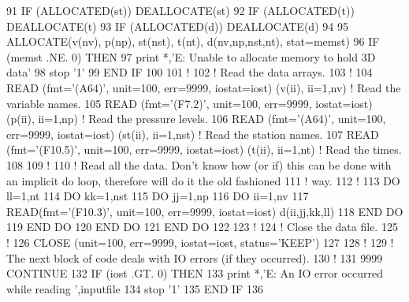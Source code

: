 \begin{DoxyCode}
91     \textcolor{keywordflow}{IF} (\textcolor{keyword}{ALLOCATED}(st))  \textcolor{keyword}{DEALLOCATE}(st)
92     \textcolor{keywordflow}{IF} (\textcolor{keyword}{ALLOCATED}(t))   \textcolor{keyword}{DEALLOCATE}(t)
93     \textcolor{keywordflow}{IF} (\textcolor{keyword}{ALLOCATED}(d))   \textcolor{keyword}{DEALLOCATE}(d)
94 
95     \textcolor{keyword}{ALLOCATE}(v(nv), p(np), st(nst), t(nt), d(nv,np,nst,nt), stat=memst)
96     \textcolor{keywordflow}{IF} (memst .NE. 0) \textcolor{keywordflow}{THEN}
97         print *,\textcolor{stringliteral}{'E: Unable to allocate memory to hold 3D data'}
98         stop \textcolor{stringliteral}{'1'}
99 \textcolor{keywordflow}{    END IF}
100 
101     \textcolor{comment}{!}
102     \textcolor{comment}{! Read the data arrays.}
103     \textcolor{comment}{!}
104     \textcolor{keyword}{READ} (fmt=\textcolor{stringliteral}{'(A64)'}, unit=100, err=9999, iostat=iost) (v(ii), ii=1,nv)       \textcolor{comment}{! Read the variable names.}
105     \textcolor{keyword}{READ} (fmt=\textcolor{stringliteral}{'(F7.2)'}, unit=100, err=9999, iostat=iost) (p(ii), ii=1,np)      \textcolor{comment}{! Read the pressure levels.}
106     \textcolor{keyword}{READ} (fmt=\textcolor{stringliteral}{'(A64)'}, unit=100, err=9999, iostat=iost) (st(ii), ii=1,nst)     \textcolor{comment}{! Read the station names.}
107     \textcolor{keyword}{READ} (fmt=\textcolor{stringliteral}{'(F10.5)'}, unit=100, err=9999, iostat=iost) (t(ii), ii=1,nt)     \textcolor{comment}{! Read the times.}
108 
109     \textcolor{comment}{!}
110     \textcolor{comment}{! Read all the data. Don't know how (or if) this can be done with an implicit do loop, therefore will
       do it the old fashioned}
111     \textcolor{comment}{! way.}
112     \textcolor{comment}{!}
113     \textcolor{keywordflow}{DO} ll=1,nt
114         \textcolor{keywordflow}{DO} kk=1,nst
115             \textcolor{keywordflow}{DO} jj=1,np
116                 \textcolor{keywordflow}{DO} ii=1,nv
117                     \textcolor{keyword}{READ}(fmt=\textcolor{stringliteral}{'(F10.3)'}, unit=100, err=9999, iostat=iost) d(ii,jj,kk,ll)
118 \textcolor{keywordflow}{                END DO}
119 \textcolor{keywordflow}{            END DO}
120 \textcolor{keywordflow}{        END DO}
121 \textcolor{keywordflow}{    END DO}
122 
123     \textcolor{comment}{!}
124     \textcolor{comment}{! Close the data file.}
125     \textcolor{comment}{!}
126     \textcolor{keyword}{CLOSE} (unit=100, err=9999, iostat=iost, status=\textcolor{stringliteral}{'KEEP'})
127 
128     \textcolor{comment}{!}
129     \textcolor{comment}{! The next block of code deals with IO errors (if they occurred).}
130     \textcolor{comment}{!}
131     9999 \textcolor{keywordflow}{CONTINUE}
132     \textcolor{keywordflow}{IF} (iost .GT. 0) \textcolor{keywordflow}{THEN}
133         print *,\textcolor{stringliteral}{'E: An IO error occurred while reading '},inputfile
134         stop \textcolor{stringliteral}{'1'}
135 \textcolor{keywordflow}{    END IF}
136 
\end{DoxyCode}


